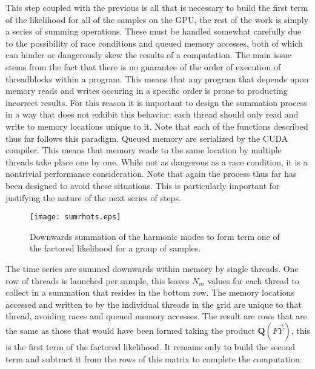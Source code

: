 \documentclass[paper=a4, fontsize=11pt]{scrartcl} %
\numberwithin{equation}{section} %
\numberwithin{figure}{section} %
\numberwithin{table}{section} %
\begin{document}
This step coupled with the previous is all that is necessary to build the first term of the likelihood for all of the samples on the GPU, the rest of the work is simply a series of summing operations. These must be handled somewhat carefully due to the possibility of race conditions and queued memory accesses, both of which can hinder or dangerously skew the results of a computation. 
The main issue stems from the fact that there is no guarantee of the order of execution of threadblocks within a program. This means that any program that depends upon memory reads and writes occuring in a specific order is prone to producting incorrect results. For this reason it is important to design the summation process in a way that does not exhibit this behavior: each thread should only read and write to memory locations unique to it. Note that each of the functions described thus far follows this paradigm.
Queued memory are serialized by the CUDA compiler. This means that memory reads to the same location by multiple threads take place one by one. While not as dangerous as a race condition, it is a nontrivial performance consideration. Note that again the process thus far has been designed to avoid these situations. This is particularly important for justifying the nature of the next series of steps.   

\clearpage

\begin{wrapfigure}{l}{0.6\textwidth}
\vspace{-0.78cm}
\begin{center}
\texttt{[image: sumrhots.eps]}
\caption{Downwards summation of the harmonic modes to form term one of the factored likelihood for a group of samples.}
\end{center}
\end{wrapfigure}

The time series are summed downwards within memory by single threads. One row of threads is launched per sample, this leaves $N_m$ values for each thread to collect in a summation that resides in the bottom row. The memory locations accessed and written to by the individual threads in the grid are unique to that thread, avoiding races and queued memory accesses. The result are rows that are the same as those that would have been formed taking the product $\mathbf{Q}(F\vec{Y})$, this is the first term of the factored likelihood. It remains only to build the second term and subtract it from the rows of this matrix to complete the computation.  
\end{document}

